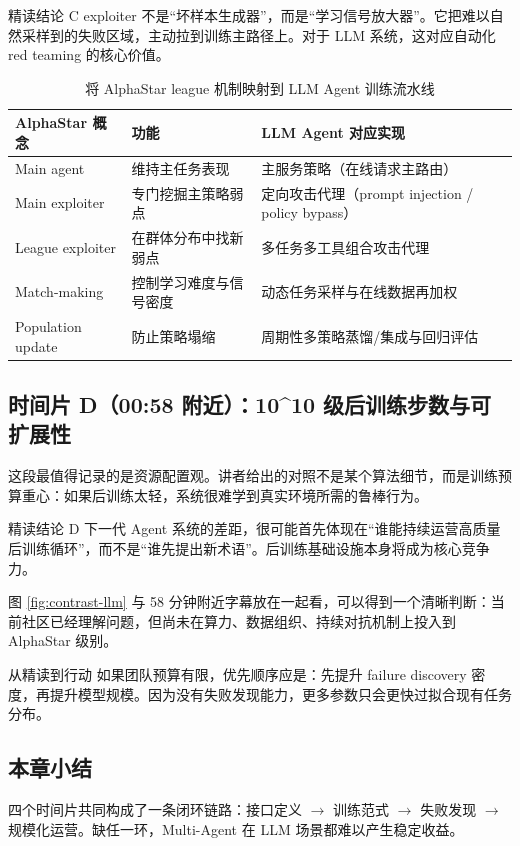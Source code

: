 \begin{knowledgebox}{精读结论 C}
exploiter 不是``坏样本生成器''，而是``学习信号放大器''。它把难以自然采样到的失败区域，主动拉到训练主路径上。对于 LLM 系统，这对应自动化 red teaming 的核心价值。
\end{knowledgebox}

\begin{table}[H]
\centering
\caption{将 AlphaStar league 机制映射到 LLM Agent 训练流水线}
\begin{tabular}{p{3.0cm}p{4.2cm}p{5.4cm}}
\toprule
AlphaStar 概念 & 功能 & LLM Agent 对应实现 \\
\midrule
Main agent & 维持主任务表现 & 主服务策略（在线请求主路由） \\
Main exploiter & 专门挖掘主策略弱点 & 定向攻击代理（prompt injection / policy bypass） \\
League exploiter & 在群体分布中找新弱点 & 多任务多工具组合攻击代理 \\
Match-making & 控制学习难度与信号密度 & 动态任务采样与在线数据再加权 \\
Population update & 防止策略塌缩 & 周期性多策略蒸馏/集成与回归评估 \\
\bottomrule
\end{tabular}
\end{table}

\subsection{时间片 D（00:58 附近）：10\^{}10 级后训练步数与可扩展性}
这段最值得记录的是资源配置观。讲者给出的对照不是某个算法细节，而是训练预算重心：如果后训练太轻，系统很难学到真实环境所需的鲁棒行为。

\begin{importantbox}{精读结论 D}
下一代 Agent 系统的差距，很可能首先体现在``谁能持续运营高质量后训练循环''，而不是``谁先提出新术语''。后训练基础设施本身将成为核心竞争力。
\end{importantbox}

图 \ref{fig:contrast-llm} 与 58 分钟附近字幕放在一起看，可以得到一个清晰判断：当前社区已经理解问题，但尚未在算力、数据组织、持续对抗机制上投入到 AlphaStar 级别。

\begin{warningbox}{从精读到行动}
如果团队预算有限，优先顺序应是：先提升 failure discovery 密度，再提升模型规模。因为没有失败发现能力，更多参数只会更快过拟合现有任务分布。
\end{warningbox}

\subsection{本章小结}
四个时间片共同构成了一条闭环链路：接口定义 $\rightarrow$ 训练范式 $\rightarrow$ 失败发现 $\rightarrow$ 规模化运营。缺任一环，Multi-Agent 在 LLM 场景都难以产生稳定收益。

